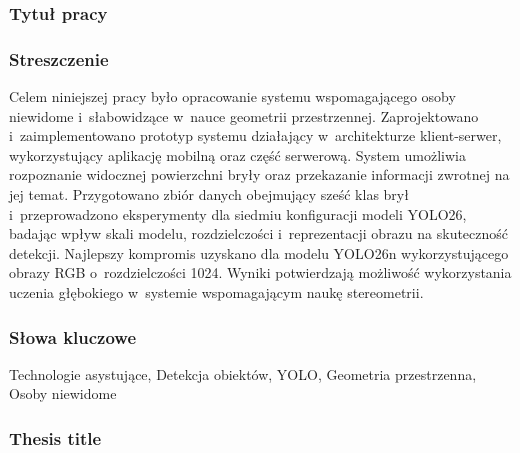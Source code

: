 \subsubsection*{Tytuł pracy}
\Title

\subsubsection*{Streszczenie}
Celem niniejszej pracy było opracowanie systemu wspomagającego osoby niewidome i~słabowidzące w~nauce geometrii przestrzennej. Zaprojektowano i~zaimplementowano prototyp systemu działający w~architekturze klient-serwer, wykorzystujący aplikację mobilną oraz część serwerową. System umożliwia rozpoznanie widocznej powierzchni bryły oraz przekazanie informacji zwrotnej na jej temat. Przygotowano zbiór danych obejmujący sześć klas brył i~przeprowadzono eksperymenty dla siedmiu konfiguracji modeli YOLO26, badając wpływ skali modelu, rozdzielczości i~reprezentacji obrazu na skuteczność detekcji. Najlepszy kompromis uzyskano dla modelu YOLO26n wykorzystującego obrazy RGB o~rozdzielczości 1024. Wyniki potwierdzają możliwość wykorzystania uczenia głębokiego w~systemie wspomagającym naukę stereometrii.

\subsubsection*{Słowa kluczowe}
Technologie asystujące, Detekcja obiektów, YOLO, Geometria przestrzenna, Osoby niewidome

\subsubsection*{Thesis title}
\begin{otherlanguage}{british}
    \TitleAlt
\end{otherlanguage}


